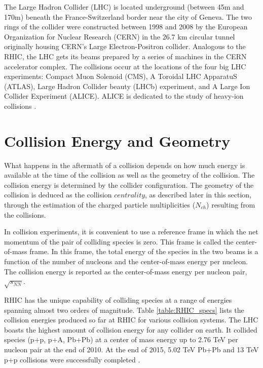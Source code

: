 The Large Hadron Collider (LHC) is located underground (between 45m and 170m) beneath the France-Switzerland border near the city of  Geneva. The two rings of the collider were constructed between 1998 and 2008 by the European Organization for Nuclear Research (CERN) in the 26.7 km circular tunnel originally housing CERN's Large Electron-Positron collider. Analogous to the RHIC, the LHC gets its beams prepared by a series of machines in the CERN accelerator complex. The collisions occur at the locations of the four big LHC experiments: Compact Muon Solenoid (CMS), A Toroidal LHC ApparatuS (ATLAS), Large Hadron Collider beauty (LHCb) experiment, and A Large Ion Collider Experiment (ALICE). ALICE is dedicated to the study of heavy-ion collisions \cite{1748-0221-3-08-S08001}.

\section{Collision Energy and Geometry}\label{geometry}
What happens in the aftermath of a collision depends on how much energy is available at the time of the collision as well as the geometry of the collision. The collision energy is determined by the collider configuration. The geometry of the collision is deduced as the collision $centrality$, as described later in this section, through the estimation of the charged particle multiplicities ($N_{ch}$) resulting from the collisions.  

In collision experiments, it is convenient to use a reference frame in which the net momentum of the pair of colliding species is zero. This frame is called the center-of-mass frame. In this frame, the total energy of the species in the two beams is a function of the number of nucleons and the center-of-mass energy per nucleon. The collision energy is reported as the center-of-mass energy per nucleon pair, $\sqrt{s_{NN}}$. %


RHIC has the unique capability of colliding species at a range of energies spanning almost two orders of magnitude. Table \ref{table:RHIC_specs} lists the collision energies produced so far at RHIC for various collision systems. The LHC boasts the highest amount of collision energy for any collider on earth. It collided species (p+p, p+A, Pb+Pb) at a center of mass energy up to 2.76 TeV per nucleon pair at the end of 2010. At the end of 2015, 5.02 TeV Pb+Pb and 13 TeV p+p collisions were successfully completed \cite{FOKA2016154}.


